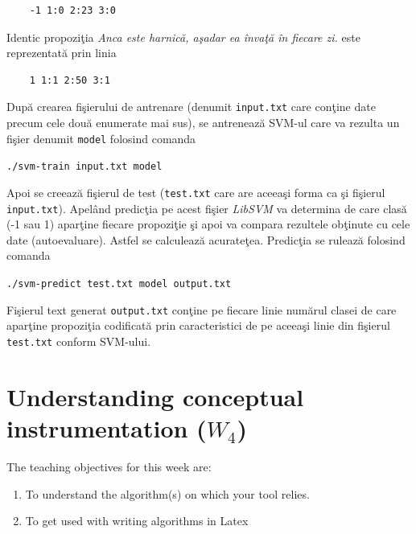 \documentclass[a4paper,12pt]{report}
\begin{document}
  \begin{verbatim}
    -1 1:0 2:23 3:0
  \end{verbatim}

  Identic propozi\c tia \textit{Anca este harnic\u a, a\c sadar ea \^inva\c t\u a \^in fiecare zi.} este
  reprezentat\u a prin linia
  
  \begin{verbatim}
    1 1:1 2:50 3:1
  \end{verbatim}
  
  Dup\u a crearea fi\c sierului de antrenare (denumit \verb|input.txt| care con\c tine 
  date precum cele dou\u a enumerate mai sus), se antreneaz\u a SVM-ul care va rezulta 
  un fi\c sier denumit \verb+model+ folosind comanda
  
  \begin{center}
    \verb|./svm-train input.txt model|
  \end{center}
  
  \par
  Apoi se creeaz\u a fi\c sierul de test (\verb+test.txt+ care are 
  aceea\c si forma ca \c si fi\c sierul \verb|input.txt|).
  Apel\^and predic\c tia pe acest fi\c sier \textit{LibSVM} va determina de care clas\u a (-1 sau 1)
  apar\c tine fiecare propozi\c tie \c si apoi va compara rezultele ob\c tinute cu cele date (autoevaluare). Astfel se 
  calculeaz\u a acurate\c tea. Predic\c tia se ruleaz\u a folosind comanda
  
  \begin{center}
    \verb|./svm-predict test.txt model output.txt|
  \end{center}

  \par
  Fi\c sierul text generat \verb+output.txt+ con\c tine pe fiecare linie num\u arul clasei de care apar\c tine 
  propozi\c tia codificat\u a prin caracteristici de pe aceea\c si linie din fi\c sierul
  \verb+test.txt+ conform SVM-ului.
  
  
  
  
  

 
 
\chapter{Understanding conceptual instrumentation ($W_4$)}
\label{ch:tool}


The teaching objectives for this week are:
\begin{enumerate}
 \item To understand the algorithm(s) on which your tool relies.
\item To get used with writing algorithms in Latex
\end{enumerate}
\end{document}
